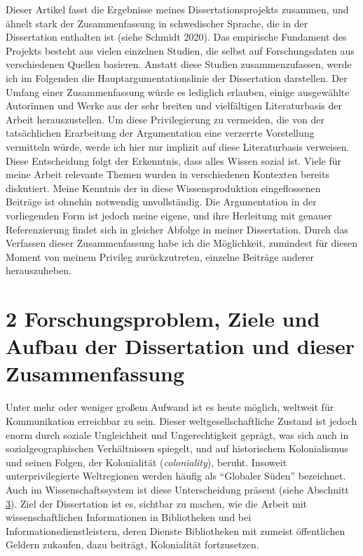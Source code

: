 \documentclass[a4paper,
fontsize=11pt,
oneside,
numbers=noperiodatend,
parskip=half-,
bibliography=totoc,
final
]{scrartcl}
\begin{document}
Dieser Artikel fasst die Ergebnisse meines Dissertationsprojekts
zusammen, und ähnelt stark der Zusammenfassung in schwedischer Sprache,
die in der Dissertation enthalten ist (siehe Schmidt 2020). Das
empirische Fundament des Projekts besteht aus vielen einzelnen Studien,
die selbst auf Forschungsdaten aus verschiedenen Quellen basieren.
Anstatt diese Studien zusammenzufassen, werde ich im Folgenden die
Hauptargumentationslinie der Dissertation darstellen. Der Umfang einer
Zusammenfassung würde es lediglich erlauben, einige ausgewählte
Autorïnnen und Werke aus der sehr breiten und vielfältigen
Literaturbasis der Arbeit herauszustellen. Um diese Privilegierung zu
vermeiden, die von der tatsächlichen Erarbeitung der Argumentation eine
verzerrte Vorstellung vermitteln würde, werde ich hier nur implizit auf
diese Literaturbasis verweisen. Diese Entscheidung folgt der Erkenntnis,
dass alles Wissen sozial ist. Viele für meine Arbeit relevante Themen
wurden in verschiedenen Kontexten bereits diskutiert. Meine Kenntnis der
in diese Wissensproduktion eingeflossenen Beiträge ist ohnehin notwendig
unvollständig. Die Argumentation in der vorliegenden Form ist jedoch
meine eigene, und ihre Herleitung mit genauer Referenzierung findet sich
in gleicher Abfolge in meiner Dissertation. Durch das Verfassen dieser
Zusammenfassung habe ich die Möglichkeit, zumindest für diesen Moment
von meinem Privileg zurückzutreten, einzelne Beiträge anderer
herauszuheben.

\hypertarget{forschungsproblem-ziele-und-aufbau-der-dissertation-und-dieser-zusammenfassung}{%
\section{2 Forschungsproblem, Ziele und Aufbau der Dissertation und
dieser
Zusammenfassung}\label{forschungsproblem-ziele-und-aufbau-der-dissertation-und-dieser-zusammenfassung}}

Unter mehr oder weniger großem Aufwand ist es heute möglich, weltweit
für Kommunikation erreichbar zu sein. Dieser weltgesellschaftliche
Zustand ist jedoch enorm durch soziale Ungleichheit und Ungerechtigkeit
geprägt, was sich auch in sozialgeographischen Verhältnissen spiegelt,
und auf historischem Kolonialismus und seinen Folgen, der Kolonialität
(\emph{coloniality}), beruht. Insoweit unterprivilegierte Weltregionen
werden häufig als \enquote{Globaler Süden} bezeichnet. Auch im
Wissenschaftssystem ist diese Unterscheidung präsent (siehe Abschnitt
\protect\hyperlink{weltges}{3}). Ziel der Dissertation ist es, sichtbar
zu machen, wie die Arbeit mit wissenschaftlichen Informationen in
Bibliotheken und bei Informationsdienstleistern, deren Dienste
Bibliotheken mit zumeist öffentlichen Geldern zukaufen, dazu beiträgt,
Kolonialität fortzusetzen.
\end{document}

